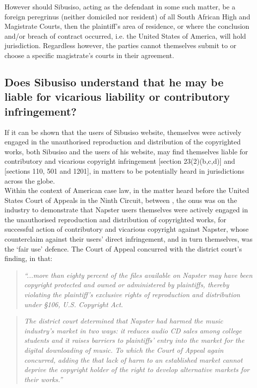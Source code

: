 \documentclass[11pt]{article}
\begin{document}
However should Sibusiso, acting as the defendant in some such matter, be a
foreign peregrinus (neither domiciled nor resident) of all South African High
and Magistrate Courts, then the plaintiff's area of residence, or where the
conclusion and/or breach of contract occurred, i.e. the United States of
America, will hold jurisdiction. Regardless however, the parties cannot
themselves submit to or choose a specific magistrate's courts in their
agreement.

\subsection{Does Sibusiso understand that he may be liable for vicarious liability or contributory infringement?}
\label{sec:org7986eac}
If it can be shown that the users of Sibusiso website, themselves were actively
engaged in the unauthorised reproduction and distribution of the copyrighted
works, both Sibusiso and the users of his website, may find themselves liable
for contributory and vicarious copyright infringement [section
23(2)(b,c,d)]\cite{rsa78_copyrightact} and [sections 110, 501 and
1201]\cite{usa76_title17_us_copyright_act}, in matters to be potentially heard in
jurisdictions across the globe.\\

Within the context of American case law, in the matter heard before the United
States Court of Appeals in the Ninth Circuit, between
\cite{scroeder01_anm_records_v_napster}, the onus was on the industry to
demonstrate that Napster users themselves were actively engaged in the
unauthorised reproduction and distribution of copyrighted works, for successful
action of contributory and vicarious copyright against Napster, whose
counterclaim against their users' direct infringement, and in turn themselves,
was the `fair use' defence. The Court of Appeal concurred with the district
court's finding, in that:
\begin{quote}
\textit{``...more than eighty percent of the files available on Napster
may have been copyright protected and owned or administered by plaintiffs,
thereby violating the plaintiff's exclusive rights of reproduction and
distribution under §106, U.S. Copyright Act.}
\end{quote}

\begin{quote}
\textit{The district court determined that Napster had harmed the music industry's
market in two ways: it reduces audio CD sales among college students and it
raises barriers to plaintiffs' entry into the market for the digital downloading
of music. To which the Court of Appeal again concurred, adding the that lack of
harm to an established market cannot deprive the copyright holder of the right
to develop alternative markets for their works.''}
\end{quote}
\end{document}
